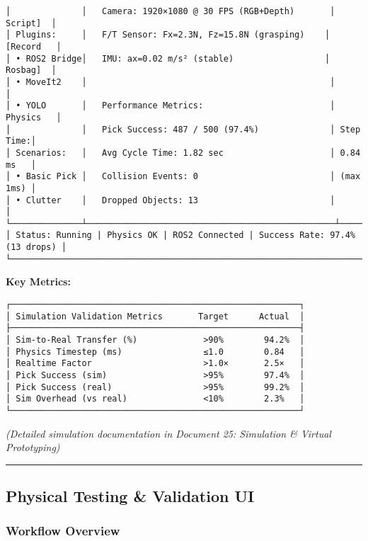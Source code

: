 \documentclass[
]{article}
\begin{document}
\begin{verbatim}
│              │   Camera: 1920×1080 @ 30 FPS (RGB+Depth)       │  Script]  │
│ Plugins:     │   F/T Sensor: Fx=2.3N, Fz=15.8N (grasping)    │ [Record   │
│ • ROS2 Bridge│   IMU: ax=0.02 m/s² (stable)                  │  Rosbag]  │
│ • MoveIt2    │                                                │           │
│ • YOLO       │   Performance Metrics:                         │ Physics   │
│              │   Pick Success: 487 / 500 (97.4%)              │ Step Time:│
│ Scenarios:   │   Avg Cycle Time: 1.82 sec                     │ 0.84 ms   │
│ • Basic Pick │   Collision Events: 0                          │ (max 1ms) │
│ • Clutter    │   Dropped Objects: 13                          │           │
└──────────────┴─────────────────────────────────────────────────┴───────────┘
│ Status: Running | Physics OK | ROS2 Connected | Success Rate: 97.4% (13 drops) │
└────────────────────────────────────────────────────────────────────────────┘
\end{verbatim}

\textbf{Key Metrics:}

\begin{verbatim}
┌─────────────────────────────────────────────────────────┐
│ Simulation Validation Metrics       Target      Actual  │
├─────────────────────────────────────────────────────────┤
│ Sim-to-Real Transfer (%)             >90%        94.2%  │
│ Physics Timestep (ms)                ≤1.0        0.84   │
│ Realtime Factor                      >1.0×       2.5×   │
│ Pick Success (sim)                   >95%        97.4%  │
│ Pick Success (real)                  >95%        99.2%  │
│ Sim Overhead (vs real)               <10%        2.3%   │
└─────────────────────────────────────────────────────────┘
\end{verbatim}

\emph{(Detailed simulation documentation in Document 25: Simulation \&
Virtual Prototyping)}

\begin{center}\rule{0.5\linewidth}{0.5pt}\end{center}

\hypertarget{physical-testing-validation-ui}{%
\subsection{Physical Testing \& Validation
UI}\label{physical-testing-validation-ui}}

\hypertarget{workflow-overview-5}{%
\subsubsection{Workflow Overview}\label{workflow-overview-5}}
\end{document}
